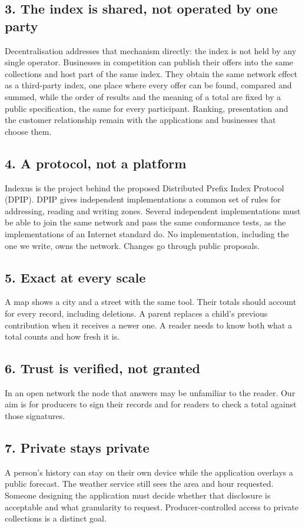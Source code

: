 \documentclass[11pt]{article}
\begin{document}
\subsection*{3. The index is shared, not operated by one party}
Decentralisation addresses that mechanism directly: the index is not held by any single operator. Businesses in competition can publish their offers into the same collections and host part of the same index. They obtain the same network effect as a third-party index, one place where every offer can be found, compared and summed, while the order of results and the meaning of a total are fixed by a public specification, the same for every participant. Ranking, presentation and the customer relationship remain with the applications and businesses that choose them.

\subsection*{4. A protocol, not a platform}
Indexus is the project behind the proposed Distributed Prefix Index Protocol (DPIP). DPIP gives independent implementations a common set of rules for addressing, reading and writing zones. Several independent implementations must be able to join the same network and pass the same conformance tests, as the implementations of an Internet standard do. No implementation, including the one we write, owns the network. Changes go through public proposals.

\subsection*{5. Exact at every scale}
A map shows a city and a street with the same tool. Their totals should account for every record, including deletions. A parent replaces a child's previous contribution when it receives a newer one. A reader needs to know both what a total counts and how fresh it is.

\subsection*{6. Trust is verified, not granted}
In an open network the node that answers may be unfamiliar to the reader. Our aim is for producers to sign their records and for readers to check a total against those signatures.

\subsection*{7. Private stays private}
A person's history can stay on their own device while the application overlays a public forecast. The weather service still sees the area and hour requested. Someone designing the application must decide whether that disclosure is acceptable and what granularity to request. Producer-controlled access to private collections is a distinct goal.
\end{document}
